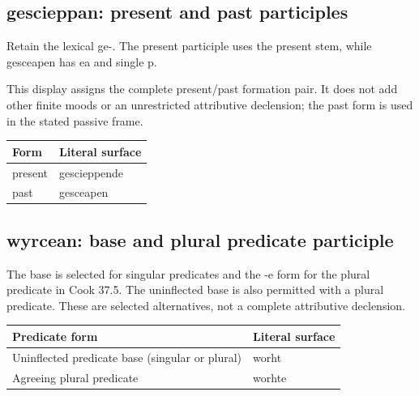 \subsection*{gescieppan: present and past participles}

Retain the lexical ge-. The present participle uses the present stem, while gesceapen has ea and single p.

This display assigns the complete present/\allowbreak{}past formation pair. It does not add other finite moods or an unrestricted attributive declension; the past form is used in the stated passive frame.

\par\begingroup
\fontsize{10.5}{13.2}\selectfont
\setlength{\LTleft}{0pt}\setlength{\LTright}{\fill}
\noindent
\begin{tabular}{@{}>{\raggedright\arraybackslash}p{51.9mm}>{\raggedright\arraybackslash}p{69.29mm}@{}}
\toprule
\textbf{Form} & \textbf{Literal surface} \\
\midrule
present & gescieppende \\
past & gesceapen \\
\bottomrule
\end{tabular}
\par\endgroup

\subsection*{wyrcean: base and plural predicate participle}

The base is selected for singular predicates and the -e form for the plural predicate in Cook 37.5. The uninflected base is also permitted with a plural predicate. These are selected alternatives, not a complete attributive declension.

\par\begingroup
\fontsize{10.5}{13.2}\selectfont
\setlength{\LTleft}{0pt}\setlength{\LTright}{\fill}
\noindent
\begin{tabular}{@{}>{\raggedright\arraybackslash}p{87.2mm}>{\raggedright\arraybackslash}p{33.98mm}@{}}
\toprule
\textbf{Predicate form} & \textbf{Literal surface} \\
\midrule
Uninflected predicate base (singular or plural) & worht \\
Agreeing plural predicate & worhte \\
\bottomrule
\end{tabular}
\par\endgroup

